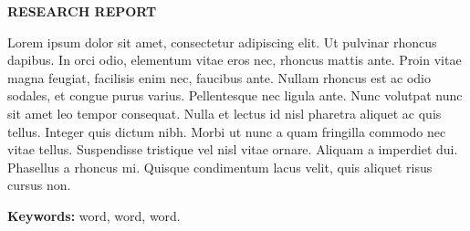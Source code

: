 \begin{center}
	\vspace{100pt}
	{\Large\sffamily\bfseries RESEARCH REPORT}
\end{center}
\noindent
Lorem ipsum dolor sit amet, consectetur adipiscing elit. Ut pulvinar rhoncus dapibus. In orci odio, elementum vitae eros nec, rhoncus mattis ante. Proin vitae magna feugiat, facilisis enim nec, faucibus ante. Nullam rhoncus est ac odio sodales, et congue purus varius. Pellentesque nec ligula ante. Nunc volutpat nunc sit amet leo tempor consequat. Nulla et lectus id nisl pharetra aliquet ac quis tellus. Integer quis dictum nibh. Morbi ut nunc a quam fringilla commodo nec vitae tellus. Suspendisse tristique vel nisl vitae ornare. Aliquam a imperdiet dui. Phasellus a rhoncus mi. Quisque condimentum lacus velit, quis aliquet risus cursus non.


\noindent
{\bfseries Keywords:} word, word, word.

\clearpage